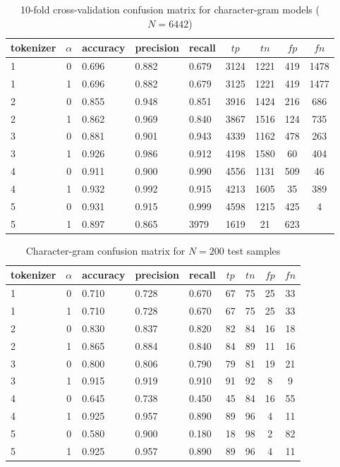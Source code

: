\documentclass[10pt]{article}
\def \corpusSize {6442}
\def \testSize {200}
\begin{document}
\begin{table}[b]
  \centering
  \caption{10-fold cross-validation confusion matrix for character-gram models ($N=\corpusSize$)}
  \label{table:char-cv}
  \begin{tabular}{lclllcccc}
    \toprule
    tokenizer & $\alpha$ & accuracy & precision & recall & $tp$ & $tn$ & $fp$ & $fn$ \\ \midrule
    1 & 0 & 0.696 & 0.882 & 0.679 & 3124 & 1221 & 419 & 1478 \\
    1 & 1 & 0.696 & 0.882 & 0.679 & 3125 & 1221 & 419 & 1477 \\
    2 & 0 & 0.855 & 0.948 & 0.851 & 3916 & 1424 & 216 & 686 \\
    2 & 1 & 0.862 & 0.969 & 0.840 & 3867 & 1516 & 124 & 735 \\
    3 & 0 & 0.881 & 0.901 & 0.943 & 4339 & 1162 & 478 & 263 \\
    3 & 1 & 0.926 & 0.986 & 0.912 & 4198 & 1580 & 60 & 404 \\
    4 & 0 & 0.911 & 0.900 & 0.990 & 4556 & 1131 & 509 & 46 \\
    4 & 1 & 0.932 & 0.992 & 0.915 & 4213 & 1605 & 35 & 389 \\
    5 & 0 & 0.931 & 0.915 & 0.999 & 4598 & 1215 & 425 & 4 \\
    5 & 1 & 0.897 & 0.865 & 3979 & 1619 & 21 & 623 \\
    \bottomrule
  \end{tabular}
\end{table}


\begin{table}[b]
  \centering
  \caption{Character-gram confusion matrix for $N=\testSize$ test samples}
  \label{table:char-t}
  \begin{tabular}{lclllcccc}
    \toprule
    tokenizer & $\alpha$ & accuracy & precision & recall & $tp$ & $tn$ & $fp$ & $fn$ \\ \midrule
    1 & 0 & 0.710 & 0.728 & 0.670 & 67 & 75 & 25 & 33 \\
    1 & 1 & 0.710 & 0.728 & 0.670 & 67 & 75 & 25 & 33 \\
    2 & 0 & 0.830 & 0.837 & 0.820 & 82 & 84 & 16 & 18 \\
    2 & 1 & 0.865 & 0.884 & 0.840 & 84 & 89 & 11 & 16 \\
    3 & 0 & 0.800 & 0.806 & 0.790 & 79 & 81 & 19 & 21 \\
    3 & 1 & 0.915 & 0.919 & 0.910 & 91 & 92 & 8 & 9 \\
    4 & 0 & 0.645 & 0.738 & 0.450 & 45 & 84 & 16 & 55 \\
    4 & 1 & 0.925 & 0.957 & 0.890 & 89 & 96 & 4 & 11 \\
    5 & 0 & 0.580 & 0.900 & 0.180 & 18 & 98 & 2 & 82 \\
    5 & 1 & 0.925 & 0.957 & 0.890 & 89 & 96 & 4 & 11 \\
    \bottomrule
  \end{tabular}
\end{table}
\end{document}
